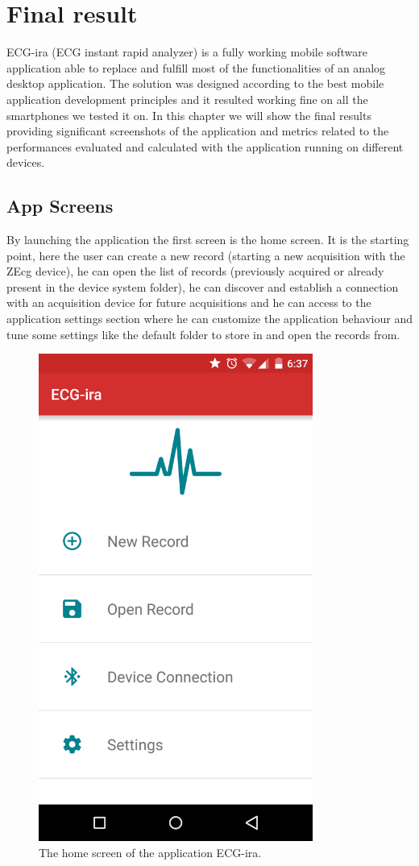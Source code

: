 \chapter{Final result}
ECG-ira (ECG instant rapid analyzer) is a fully working mobile software application able to replace and fulfill most of the functionalities of an analog desktop application. The solution was designed according to the best mobile application development principles and it resulted working fine on all the smartphones\cite{ref27} we tested it on. In this chapter we will show the final results providing significant screenshots of the application and metrics related to the performances evaluated and calculated with the application running on different devices.
\section{App Screens}
By launching the application the first screen is the home screen. It is the starting point, here the user can create a new record (starting a new acquisition with the ZEcg device), he can open the list of records (previously acquired or already present in the device system folder), he can discover and establish  a connection with an acquisition device for future acquisitions and he can access to the application settings section where he can customize the application behaviour and tune some settings like the default folder to store in and open the records from.
\begin{figure}[ht!]
	\centering
	\includegraphics[width=90mm]{figures/ch10/1.png}
	\caption{The home screen of the application ECG-ira.}
	\label{fig10.1}
\end{figure}
